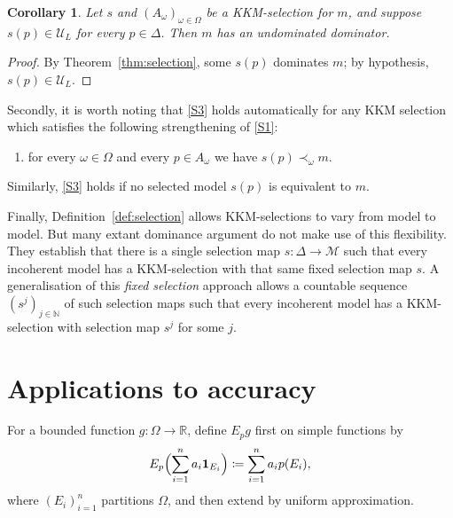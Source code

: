 \documentclass[11pt]{article}
\newcommand{\chg}[1]{{\color{red}#1}}
\newtheorem{corollary}[theorem]{Corollary}
\theoremstyle{definition}
\theoremstyle{remark}
\newcommand{\M}{\mathcal M}
\newcommand{\U}{\mathcal U}
\begin{document}
\begin{corollary}\label{cor:undominated-dominators}
Let $s$ and $(A_\omega)_{\omega\in\Omega}$ be a KKM-selection for $m$, and suppose $s(p)\in\U_L$ for every $p\in\Delta$. Then $m$ has an undominated dominator.
\end{corollary}
\begin{proof}
\chg{By Theorem~\ref{thm:selection}, some $s(p)$ dominates $m$; by hypothesis, $s(p)\in\U_L$.}
\end{proof}

Secondly, it is worth noting that \ref{S3} holds automatically for any KKM selection which satisfies the following strengthening of \ref{S1}:
\begin{enumerate}[label=(S\arabic*$^\prime$),leftmargin=3em]
\item\label{S1'} for every $\omega\in\Omega$ and every $p\in A_\omega$ we have $s(p)\prec_\omega m$.
\end{enumerate}
\noindent Similarly, \ref{S3} holds if no selected model $s(p)$ is equivalent to $m$.


Finally, \chg{Definition~\ref{def:selection}} allows KKM-selections to vary from model to model. But many extant dominance argument do not make use of this flexibility. They establish that there is a single selection map $s:\Delta\to\M$ such that every incoherent model has a KKM-selection with that same fixed selection map $s$. A generalisation of this \emph{fixed selection} approach allows a countable sequence $(s^j)_{j\in\mathbb N}$ of such selection maps such that every incoherent model has a KKM-selection with selection map $s^j$ for some $j$.









\section{Applications to accuracy}\label{sec:applications}

For a bounded function $g:\Omega\to\mathbb R$, define $E_pg$ first on simple functions by
\[
E_p\Bigl(\sum_{i=1}^n a_i\mathbf1_{E_i}\Bigr)
\coloneqq\sum_{i=1}^n a_i p(E_i),
\]
where $(E_i)_{i=1}^n$ partitions $\Omega$, and then extend by uniform approximation.
\end{document}

